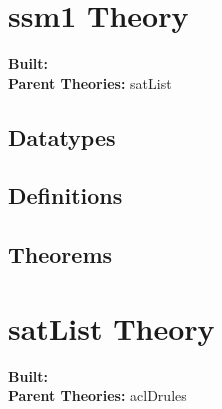 \documentclass[11pt, twoside]{article}
\begin{document}



\tableofcontents
\cleardoublepage
\HOLpagestyle

\section{ssm1 Theory}
\begin{flushleft}
\textbf{Built:} \HOLssmOneDate \\[2pt]
\textbf{Parent Theories:} satList
\end{flushleft}

\subsection{Datatypes}

\HOLssmOneDatatypes

\subsection{Definitions}

\HOLssmOneDefinitions

\subsection{Theorems}

\HOLssmOneTheorems

\section{satList Theory}
\begin{flushleft}
\textbf{Built:} \HOLsatListDate \\[2pt]
\textbf{Parent Theories:} aclDrules
\end{flushleft}
\end{document}
